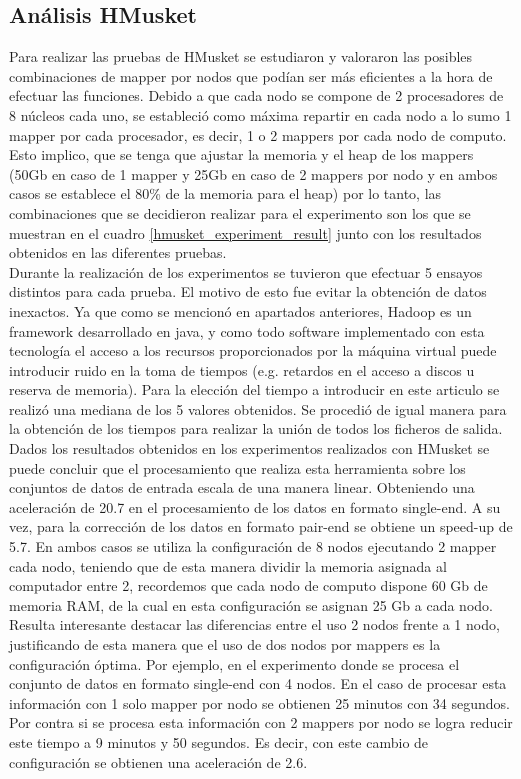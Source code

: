 \documentclass[conference]{IEEEtran}
\begin{document}
\subsection{Análisis HMusket}
Para realizar las pruebas de HMusket se estudiaron y valoraron las posibles combinaciones de mapper por nodos que podían ser más eficientes a la hora de efectuar las funciones. Debido a que cada nodo se compone de 2 procesadores de 8 núcleos cada uno, se estableció como máxima repartir en cada nodo a lo sumo 1 mapper por cada procesador, es decir, 1 o 2 mappers por cada nodo de computo. Esto implico, que se tenga que ajustar la memoria y el heap de los mappers (50Gb en caso de 1 mapper y 25Gb en caso de 2 mappers por nodo y en ambos casos se establece el 80\% de la memoria para el heap) por lo tanto, las combinaciones que se decidieron realizar para el experimento son los que se muestran en el cuadro \ref{hmusket_experiment_result} junto con los resultados obtenidos en las diferentes pruebas.\\

Durante la realización de los experimentos se tuvieron que efectuar 5 ensayos distintos para cada prueba. El motivo de esto fue evitar la obtención de datos inexactos. Ya que como se mencionó en apartados anteriores, Hadoop es un framework desarrollado en java, y como todo software implementado con esta tecnología el acceso a los recursos proporcionados por la máquina virtual puede introducir ruido en la toma de tiempos (e.g. retardos en el acceso a discos u reserva de memoria). Para la elección del tiempo a introducir en este articulo se realizó una mediana de los 5 valores obtenidos. Se procedió de igual manera para la obtención de los tiempos para realizar la unión de todos los ficheros de salida.\\

Dados los resultados obtenidos en los experimentos realizados con HMusket se puede concluir que el procesamiento que realiza esta herramienta sobre los conjuntos de datos de entrada escala de una manera linear. Obteniendo una aceleración de 20.7 en el procesamiento de los datos en formato single-end. A su vez, para la corrección de los datos en formato pair-end se obtiene un speed-up de 5.7. En ambos casos se utiliza la configuración de 8 nodos ejecutando 2 mapper cada nodo, teniendo que de esta manera dividir la memoria asignada al computador entre 2, recordemos que cada nodo de computo dispone 60 Gb de memoria RAM, de la cual en esta configuración se asignan 25 Gb a cada nodo. Resulta interesante destacar las diferencias entre el uso 2 nodos frente a 1 nodo, justificando de esta manera que el uso de dos nodos por mappers es la configuración óptima. Por ejemplo, en el experimento donde se procesa el conjunto de datos en formato single-end con 4 nodos. En el caso de procesar esta información con 1 solo mapper por nodo se obtienen 25 minutos con 34 segundos. Por contra si se procesa esta información con 2 mappers por nodo se logra reducir este tiempo a  9 minutos y 50 segundos. Es decir, con este cambio de configuración se obtienen una aceleración de 2.6.\\
\end{document}
